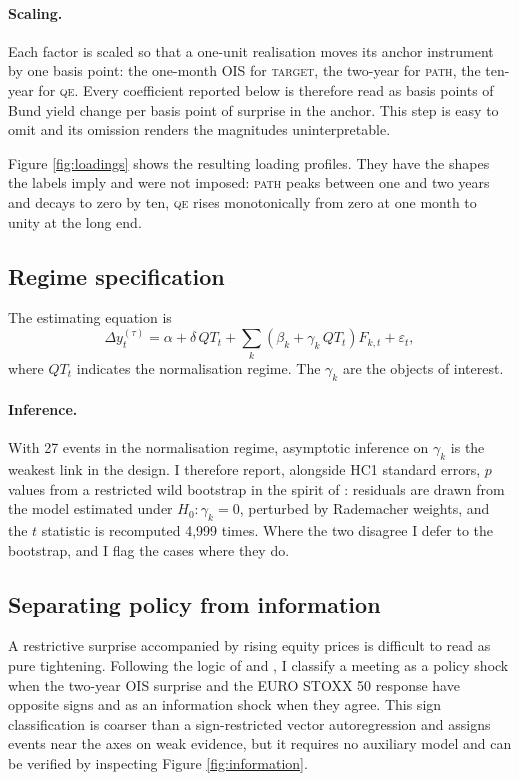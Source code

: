 \documentclass[11pt]{article}
\begin{document}
\paragraph{Scaling.} Each factor is scaled so that a one-unit realisation moves
its anchor instrument by one basis point: the one-month OIS for \textsc{target},
the two-year for \textsc{path}, the ten-year for \textsc{qe}. Every coefficient
reported below is therefore read as basis points of Bund yield change per basis
point of surprise in the anchor. This step is easy to omit and its omission
renders the magnitudes uninterpretable.

Figure \ref{fig:loadings} shows the resulting loading profiles. They have the
shapes the labels imply and were not imposed: \textsc{path} peaks between one and
two years and decays to zero by ten, \textsc{qe} rises monotonically from zero at
one month to unity at the long end.

\subsection{Regime specification}

The estimating equation is
\begin{equation}
\Delta y_t^{(\tau)} = \alpha + \delta\, QT_t
+ \sum_{k} \left(\beta_k + \gamma_k\, QT_t\right) F_{k,t} + \varepsilon_t,
\label{eq:main}
\end{equation}
where $QT_t$ indicates the normalisation regime. The $\gamma_k$ are the objects
of interest.

\paragraph{Inference.} With 27 events in the normalisation regime, asymptotic
inference on $\gamma_k$ is the weakest link in the design. I therefore report,
alongside HC1 standard errors, $p$ values from a restricted wild bootstrap in the spirit of \citet{cameron2008}:
residuals are drawn from the model estimated under $H_0: \gamma_k = 0$,
perturbed by Rademacher weights, and the $t$ statistic is recomputed 4{,}999
times. Where the two disagree I defer to the bootstrap, and I flag the cases
where they do.

\subsection{Separating policy from information}

A restrictive surprise accompanied by rising equity prices is difficult to read
as pure tightening. Following the logic of \citet{jarocinski2020} and
\citet{nakamura2018}, I classify a meeting as a policy shock when the two-year
OIS surprise and the EURO STOXX 50 response have opposite signs and as an
information shock when they agree. This sign classification is coarser than a
sign-restricted vector autoregression and assigns events near the axes on weak
evidence, but it requires no auxiliary model and can be verified by inspecting
Figure \ref{fig:information}.
\end{document}
